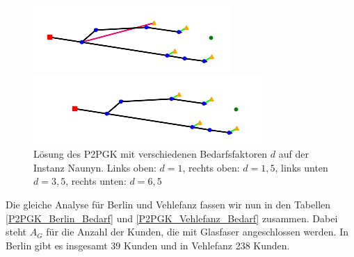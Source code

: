 \documentclass[11pt,a4paper]{article}
\theoremstyle{my_th_style1}
\begin{document}
\begin{figure}[h]
\begin{minipage}[b]{0.4\textwidth}
		\includegraphics[width=\textwidth]{./Bilder/P2PGK_Naunyn_demand3_5_duration0}
	\end{minipage}
	\begin{minipage}[b]{0.4\textwidth}
		\includegraphics[width=\textwidth]{./Bilder/P2PGK_Naunyn_demand6_5_duration0}
	\end{minipage}
	\caption{Lösung des P2PGK mit verschiedenen Bedarfsfaktoren $d$ auf der Instanz Naunyn. Links oben: $d=1$, rechts oben: $d=1,5$, links unten $d=3,5$, rechts unten: $d=6,5$}
	\label{P2PGK_Naunyn_Bedarf}
\end{figure}

Die gleiche Analyse für Berlin und Vehlefanz fassen wir nun in den Tabellen \eqref{P2PGK_Berlin_Bedarf} und \eqref{P2PGK_Vehlefanz_Bedarf} zusammen.
Dabei steht $A_G$ für die Anzahl der Kunden, die mit Glasfaser angeschlossen werden.
In Berlin gibt es insgesamt 39 Kunden und in Vehlefanz 238 Kunden.
\end{document}
